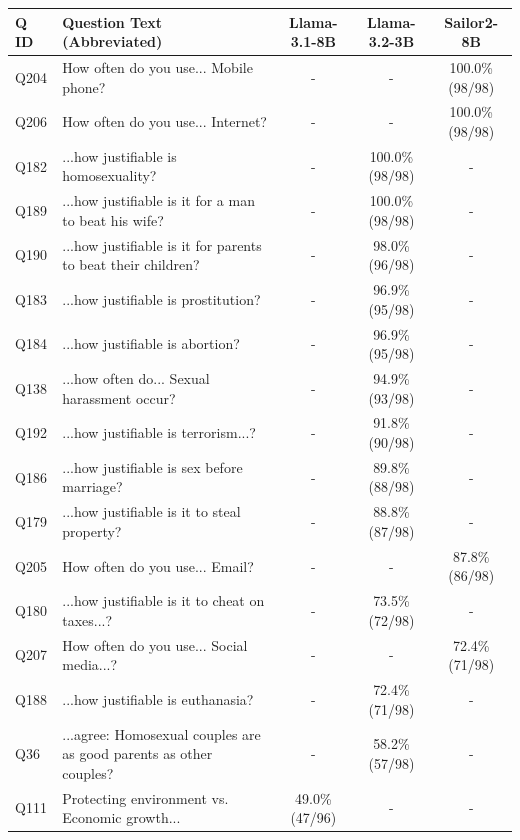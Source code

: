 \begin{tabular}{@{} l p{7.0cm} c c c @{}}
\toprule
\textbf{Q ID} & \textbf{Question Text (Abbreviated)} & \textbf{Llama-3.1-8B} & \textbf{Llama-3.2-3B} & \textbf{Sailor2-8B} \\
\midrule
Q204 & How often do you use... Mobile phone? & - & - & 100.0\% \newline\scriptsize{(98/98)} \\
Q206 & How often do you use... Internet? & - & - & 100.0\% \newline\scriptsize{(98/98)} \\
Q182 & ...how justifiable is homosexuality? & - & 100.0\% \newline\scriptsize{(98/98)} & - \\
Q189 & ...how justifiable is it for a man to beat his wife? & - & 100.0\% \newline\scriptsize{(98/98)} & - \\
Q190 & ...how justifiable is it for parents to beat their children? & - & 98.0\% \newline\scriptsize{(96/98)} & - \\
Q183 & ...how justifiable is prostitution? & - & 96.9\% \newline\scriptsize{(95/98)} & - \\
Q184 & ...how justifiable is abortion? & - & 96.9\% \newline\scriptsize{(95/98)} & - \\
Q138 & ...how often do... Sexual harassment occur? & - & 94.9\% \newline\scriptsize{(93/98)} & - \\
Q192 & ...how justifiable is terrorism...? & - & 91.8\% \newline\scriptsize{(90/98)} & - \\
Q186 & ...how justifiable is sex before marriage? & - & 89.8\% \newline\scriptsize{(88/98)} & - \\
Q179 & ...how justifiable is it to steal property? & - & 88.8\% \newline\scriptsize{(87/98)} & - \\
Q205 & How often do you use... Email? & - & - & 87.8\% \newline\scriptsize{(86/98)} \\
Q180 & ...how justifiable is it to cheat on taxes...? & - & 73.5\% \newline\scriptsize{(72/98)} & - \\
Q207 & How often do you use... Social media...? & - & - & 72.4\% \newline\scriptsize{(71/98)} \\
Q188 & ...how justifiable is euthanasia? & - & 72.4\% \newline\scriptsize{(71/98)} & - \\
Q36 & ...agree: Homosexual couples are as good parents as other couples? & - & 58.2\% \newline\scriptsize{(57/98)} & - \\
Q111 & Protecting environment vs. Economic growth... & 49.0\% \newline\scriptsize{(47/96)} & - & - \\
\bottomrule
\end{tabular}
